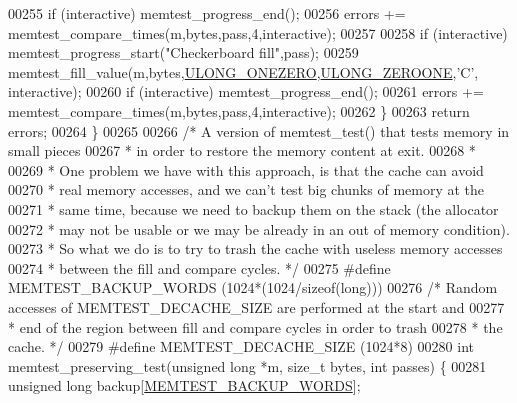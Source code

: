 \begin{DoxyCode}
{{{{00255         \textcolor{keywordflow}{if} (interactive) memtest\_progress\_end();
00256         errors += memtest\_compare\_times(m,bytes,pass,4,interactive);
00257 
00258         \textcolor{keywordflow}{if} (interactive) memtest\_progress\_start(\textcolor{stringliteral}{"Checkerboard fill"},pass);
00259         memtest\_fill\_value(m,bytes,\hyperlink{memtest_8c_a927b6adad012fd0e4e067a706d8df6e9}{ULONG\_ONEZERO},\hyperlink{memtest_8c_ae1766c92a4af73778f7c05a7bd9deaf1}{ULONG\_ZEROONE},\textcolor{stringliteral}{'C'},
      interactive);
00260         \textcolor{keywordflow}{if} (interactive) memtest\_progress\_end();
00261         errors += memtest\_compare\_times(m,bytes,pass,4,interactive);
00262     \}
00263     \textcolor{keywordflow}{return} errors;
00264 \}
00265 
00266 \textcolor{comment}{/* A version of memtest\_test() that tests memory in small pieces}
00267 \textcolor{comment}{ * in order to restore the memory content at exit.}
00268 \textcolor{comment}{ *}
00269 \textcolor{comment}{ * One problem we have with this approach, is that the cache can avoid}
00270 \textcolor{comment}{ * real memory accesses, and we can't test big chunks of memory at the}
00271 \textcolor{comment}{ * same time, because we need to backup them on the stack (the allocator}
00272 \textcolor{comment}{ * may not be usable or we may be already in an out of memory condition).}
00273 \textcolor{comment}{ * So what we do is to try to trash the cache with useless memory accesses}
00274 \textcolor{comment}{ * between the fill and compare cycles. */}
00275 \textcolor{preprocessor}{#}\textcolor{preprocessor}{define} \textcolor{preprocessor}{MEMTEST\_BACKUP\_WORDS} \textcolor{preprocessor}{(}1024\textcolor{preprocessor}{*}\textcolor{preprocessor}{(}1024\textcolor{preprocessor}{/}\textcolor{keyword}{sizeof}\textcolor{preprocessor}{(}\textcolor{keywordtype}{long}\textcolor{preprocessor}{)}\textcolor{preprocessor}{)}\textcolor{preprocessor}{)}
00276 \textcolor{comment}{/* Random accesses of MEMTEST\_DECACHE\_SIZE are performed at the start and}
00277 \textcolor{comment}{ * end of the region between fill and compare cycles in order to trash}
00278 \textcolor{comment}{ * the cache. */}
00279 \textcolor{preprocessor}{#}\textcolor{preprocessor}{define} \textcolor{preprocessor}{MEMTEST\_DECACHE\_SIZE} \textcolor{preprocessor}{(}1024\textcolor{preprocessor}{*}8\textcolor{preprocessor}{)}
00280 \textcolor{keywordtype}{int} memtest\_preserving\_test(\textcolor{keywordtype}{unsigned} \textcolor{keywordtype}{long} *m, size\_t bytes, \textcolor{keywordtype}{int} passes) \{
00281     \textcolor{keywordtype}{unsigned} \textcolor{keywordtype}{long} backup[\hyperlink{memtest_8c_a836fc304e6b2a982c5fc97ce9ca8598a}{MEMTEST\_BACKUP\_WORDS}];
}}}}
\end{DoxyCode}
